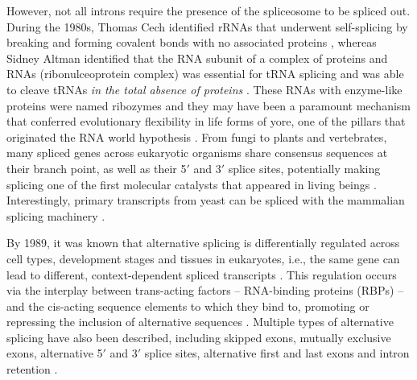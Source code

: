 However, not all introns require the presence of the spliceosome to be spliced out. During the 1980s, Thomas Cech identified rRNAs that underwent self-splicing by breaking and forming covalent bonds with no associated proteins \cite{kruger:1982wk}, whereas Sidney Altman identified that the RNA subunit of a complex of proteins and RNAs (ribonulceoprotein complex) was essential for tRNA splicing and was able to cleave tRNAs \emph{in the total absence of proteins} \cite{altman:1986wp}. These RNAs with enzyme-like proteins were named ribozymes and they may have been a paramount mechanism that conferred evolutionary flexibility in life forms of yore, one of the pillars that originated the RNA world hypothesis \cite{kruger:1982wk,gilbert:1986td}. From fungi to plants and vertebrates, many spliced genes across eukaryotic organisms share consensus sequences at their branch point, as well as their 5$'$ and 3$'$ splice sites, potentially making splicing one of the first molecular catalysts that appeared in living beings \cite{sharp:1985th}. Interestingly, primary transcripts from yeast can be spliced with the mammalian splicing machinery \cite{sharp:1985th}.

By 1989, it was known that alternative splicing is differentially regulated across cell types, development stages and tissues in eukaryotes, i.e., the same gene can lead to different, context-dependent spliced transcripts \cite{smith:1989tr}. This regulation occurs via the interplay between trans-acting factors -- RNA-binding proteins (RBPs) -- and the cis-acting sequence elements to which they bind to, promoting or repressing the inclusion of alternative sequences \cite{smith:1989tr}. Multiple types of alternative splicing have also been described, including skipped exons, mutually exclusive exons, alternative 5$'$ and 3$'$ splice sites, alternative first and last exons and intron retention \cite{smith:1989tr}.



